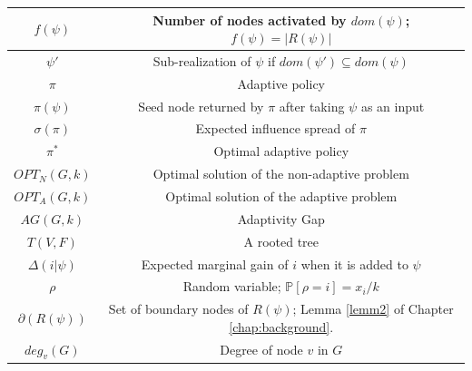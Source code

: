\begin{table} [ht]
\begin{adjustbox}{width=1\textwidth}
\begin{tabular}{ | c | c | }
    $f(\psi)$& Number of nodes activated by  $dom(\psi)$; $f(\psi) = |R(\psi)|$\\[1ex] \hline
    $\psi'$& Sub-realization of $\psi$ if $dom(\psi') \subseteq dom(\psi)$\\[1ex] \hline
    $\pi$& Adaptive policy \\[1ex] \hline
    $\pi(\psi)$& Seed node returned by $\pi$ after taking $\psi$ as an input\\[1ex] \hline
    $\sigma(\pi)$& Expected influence spread of $\pi$\\[1ex] \hline
    $\pi^*$& Optimal adaptive policy\\[1ex] \hline
    $OPT_N(G,k)$& Optimal solution of the non-adaptive problem\\[1ex] \hline
    $OPT_A(G,k)$& Optimal solution of the adaptive problem\\[1ex] \hline
    $AG(G,k)$& Adaptivity Gap\\[1ex] \hline
    $T(V,F)$& A rooted tree\\[1ex] \hline
    $\Delta(i|\psi)$& Expected marginal gain of $i$ when it is added to $\psi$\\[1ex] \hline
    $\rho$& Random variable; $\mathbb{P}[\rho=i]=x_i/k$\\[1ex] \hline
    $\partial(R(\psi))$& Set of boundary nodes of $R(\psi)$; Lemma \ref{lemm2} of Chapter \ref{chap:background}.\\[1ex] \hline
    $deg_v(G)$& Degree of node $v$ in $G$\\[1ex] \hline
    \end{tabular}
    \end{adjustbox}
    \end{table}
    
    
    
